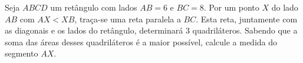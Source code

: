 Seja $ABCD$ um retângulo com lados $AB = 6$ e $BC = 8$. Por um ponto $X$ do lado $AB$
com $AX < XB$, traça-se uma reta paralela a $BC$. Esta reta, juntamente com as diagonais
e os lados do retângulo, determinará $3$ quadriláteros. Sabendo que a soma das áreas desses
quadriláteros é a maior possível, calcule a medida do segmento $AX$.